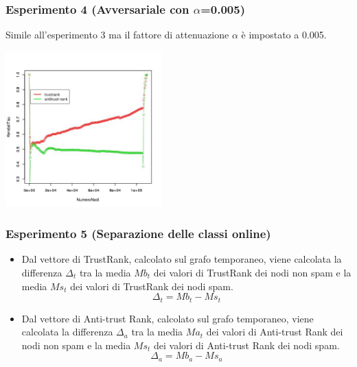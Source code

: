 \documentclass{beamer}
\begin{document}
\begin{frame}
\frametitle{Esperimento 4 {\tiny(Avversariale con \(\alpha\)=0.005)}}
Simile all'esperimento 3 ma il fattore di attenuazione \(\alpha\)  è impostato a 0.005.
   \begin{center}
 \includegraphics[height=6cm]{immagini/test4/coplotTrustAnti_Mode1_set3776_62_alpha0005}
\end{center}
\end{frame}
\begin{frame}
\frametitle{Esperimento 5 {\tiny(Separazione delle classi online)}}
\begin{itemize}
 \item Dal vettore di TrustRank,  calcolato sul grafo temporaneo, viene calcolata la differenza \(\Delta_t\) tra la media \(Mb_t\) dei valori di TrustRank dei nodi non spam e la media \(Ms_t\) dei valori di TrustRank dei nodi spam.
 \begin{equation}
 \Delta_t = Mb_t-Ms_t
\end{equation}
  \item Dal vettore di Anti-trust Rank,  calcolato sul grafo temporaneo, viene calcolata la differenza \(\Delta_a\) tra la media \(Ma_t\) dei valori di Anti-trust Rank dei nodi non spam e la media \(Ms_t\) dei valori di Anti-trust Rank dei nodi spam.
  \begin{equation}
 \Delta_a=Mb_a-Ms_a
\end{equation}
\end{itemize}
\end{frame}
\end{document}
